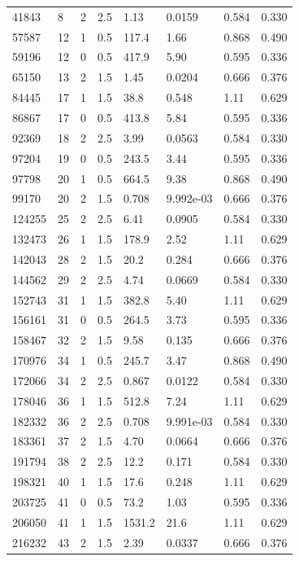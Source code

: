 \documentclass[preview]{standalone}
\begin{document}
{{\begin{tabular}{L{1.2cm}C{1.2cm} C{0.3cm}C{0.5cm} C{1.4cm}C{1.4cm} C{1.4cm}C{1.4cm}}
  41843  &     8  & 2     & 2.5 &  1.13  & 0.0159  & 0.584 &  0.330   \\ 
  57587  &    12  & 1     & 0.5 &  117.4  & 1.66  & 0.868 &  0.490   \\ 
  59196  &    12  & 0     & 0.5 &  417.9  & 5.90  & 0.595 &  0.336   \\ 
  65150  &    13  & 2     & 1.5 &  1.45  & 0.0204  & 0.666 &  0.376   \\ 
  84445  &    17  & 1     & 1.5 &  38.8  & 0.548  & 1.11 &  0.629   \\ 
  86867  &    17  & 0     & 0.5 &  413.8  & 5.84  & 0.595 &  0.336   \\ 
  92369  &    18  & 2     & 2.5 &  3.99  & 0.0563  & 0.584 &  0.330   \\ 
  97204  &    19  & 0     & 0.5 &  243.5  & 3.44  & 0.595 &  0.336   \\ 
  97798  &    20  & 1     & 0.5 &  664.5  & 9.38  & 0.868 &  0.490   \\ 
  99170  &    20  & 2     & 1.5 &  0.708  & 9.992e-03  & 0.666 &  0.376   \\ 
  124255  &    25  & 2     & 2.5 &  6.41  & 0.0905  & 0.584 &  0.330   \\ 
  132473  &    26  & 1     & 1.5 &  178.9  & 2.52  & 1.11 &  0.629   \\ 
  142043  &    28  & 2     & 1.5 &  20.2  & 0.284  & 0.666 &  0.376   \\ 
  144562  &    29  & 2     & 2.5 &  4.74  & 0.0669  & 0.584 &  0.330   \\ 
  152743  &    31  & 1     & 1.5 &  382.8  & 5.40  & 1.11 &  0.629   \\ 
  156161  &    31  & 0     & 0.5 &  264.5  & 3.73  & 0.595 &  0.336   \\ 
  158467  &    32  & 2     & 1.5 &  9.58  & 0.135  & 0.666 &  0.376   \\ 
  170976  &    34  & 1     & 0.5 &  245.7  & 3.47  & 0.868 &  0.490   \\ 
  172066  &    34  & 2     & 2.5 &  0.867  & 0.0122  & 0.584 &  0.330   \\ 
  178046  &    36  & 1     & 1.5 &  512.8  & 7.24  & 1.11 &  0.629   \\ 
  182332  &    36  & 2     & 2.5 &  0.708  & 9.991e-03  & 0.584 &  0.330   \\ 
  183361  &    37  & 2     & 1.5 &  4.70  & 0.0664  & 0.666 &  0.376   \\ 
  191794  &    38  & 2     & 2.5 &  12.2  & 0.171  & 0.584 &  0.330   \\ 
  198321  &    40  & 1     & 1.5 &  17.6  & 0.248  & 1.11 &  0.629   \\ 
  203725  &    41  & 0     & 0.5 &  73.2  & 1.03  & 0.595 &  0.336   \\ 
  206050  &    41  & 1     & 1.5 &  1531.2  & 21.6  & 1.11 &  0.629   \\ 
  216232  &    43  & 2     & 1.5 &  2.39  & 0.0337  & 0.666 &  0.376   \\ 
\hline 
\end{tabular} 

}}
\end{document}
